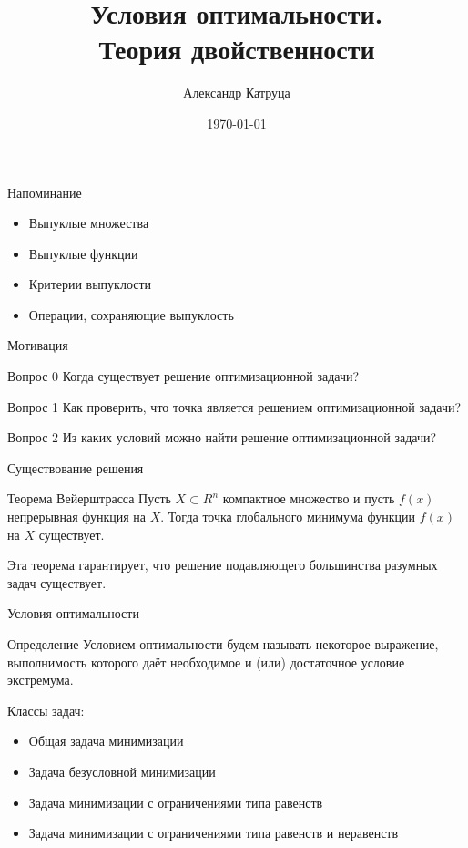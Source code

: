 \documentclass[12pt]{beamer}
\title[]{Условия оптимальности.\\Теория двойственности}
\author{Александр Катруца}
\institute{Московский физико-технический институт,\\
Факультет Управления и Прикладной Математики}
\date{\today}
\begin{document}
\begin{frame}
\maketitle
\end{frame}

\begin{frame}{Напоминание}
\begin{itemize}
\item Выпуклые множества
\item Выпуклые функции
\item Критерии выпуклости
\item Операции, сохраняющие выпуклость
\end{itemize}
\end{frame}

\begin{frame}{Мотивация}

\begin{block}{Вопрос 0}
Когда существует решение оптимизационной задачи?
\end{block}

\begin{block}{Вопрос 1}
Как проверить, что точка является решением оптимизационной задачи? 
\end{block}

\begin{block}{Вопрос 2}
Из каких условий можно найти решение оптимизационной задачи?
\end{block}

\end{frame}

\begin{frame}{Существование решения}
\begin{block}{Теорема Вейерштрасса}
Пусть $X \subset R^n$ компактное множество и пусть $f(x)$ непрерывная функция на $X$. 
Тогда точка глобального минимума функции $f (x)$ на $X$ существует.
\end{block}

Эта теорема гарантирует, что решение подавляющего большинства разумных задач существует.
 
\end{frame}

\begin{frame}{Условия оптимальности}
\begin{block}{Определение}
Условием оптимальности будем называть некоторое выражение, выполнимость которого даёт необходимое и (или) достаточное условие экстремума. 
\end{block}
Классы задач:
\begin{itemize}
\item Общая задача минимизации
\item Задача безусловной минимизации
\item Задача минимизации с ограничениями типа равенств
\item Задача минимизации с ограничениями типа равенств и неравенств
\end{itemize}
\end{frame}
\end{document}

